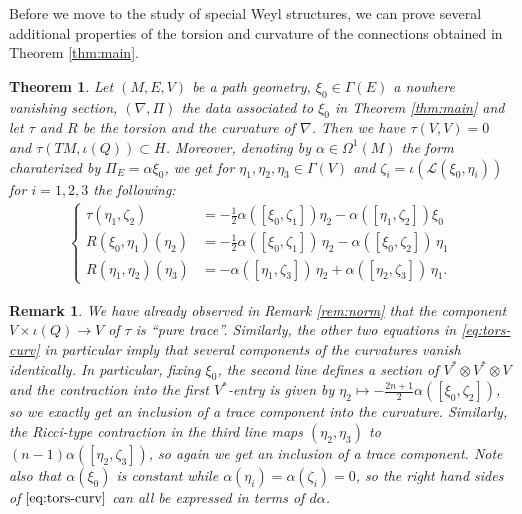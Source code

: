 \documentclass[11pt]{amsart}
\newtheorem{theorem}[proposition]{Theorem}
\newtheorem{remark}[proposition]{Remark}
\numberwithin{proposition}{section}
\numberwithin{equation}{section}
\begin{document}
Before we move to the study of special Weyl structures, we can prove several additional properties of the torsion and curvature of the connections obtained in Theorem \ref{thm:main}. 
\begin{theorem}\label{tors-curv}
  Let $(M,E,V)$ be a path geometry, $\xi_0\in\Gamma(E)$ a nowhere vanishing section, $(\nabla,\Pi)$ the data associated to $\xi_0$ in Theorem \ref{thm:main} and let $\tau$ and $R$ be the torsion and the curvature of $\nabla$. Then we have $\tau(V,V)=0$ and $\tau(TM,\iota(Q))\subset H$. Moreover, denoting by $\alpha\in\Omega^1(M)$ the form charaterized by $\Pi_E=\alpha\xi_0$, we get for $\eta_1,\eta_2,\eta_3\in\Gamma(V)$ and $\zeta_i=\iota(\mathcal L(\xi_0,\eta_i))$ for $i=1,2,3$ the following:
\begin{equation}\label{eq:tors-curv}
\begin{aligned}
\begin{cases}
\tau(\eta_1,\zeta_2)&=-\tfrac12\alpha([\xi_0,\zeta_1])\eta_2-\alpha([\eta_1,\zeta_2])\xi_0\\ 
R(\xi_0,\eta_1)(\eta_2)&=-\tfrac12\alpha([\xi_0,\zeta_1])\,\eta_2-\alpha([\xi_0,\zeta_2])\,\eta_1\\
R(\eta_1,\eta_2)(\eta_3)&=-\alpha([\eta_1,\zeta_3])\,\eta_2+\alpha([\eta_2,\zeta_3])\,\eta_1.
\end{cases}
\end{aligned}
\end{equation}  
\end{theorem}
\begin{remark}\label{rem:curvature}
   We have already observed in Remark \ref{rem:norm} that the component $V\times\iota(Q)\to V$ of $\tau$ is ``pure trace''. Similarly, the other two equations in \eqref{eq:tors-curv} in particular imply that several components of the curvatures vanish identically. In particular, fixing $\xi_0$, the second line defines a section of $V^*\otimes V^*\otimes V$ and the contraction into the first $V^*$-entry is given by $\eta_2\mapsto -\frac{2n+1}{2}\alpha([\xi_0,\zeta_2])$, so we exactly get an inclusion of a trace component into the curvature. Similarly, the Ricci-type contraction in the third line maps $(\eta_2,\eta_3)$ to $(n-1)\alpha([\eta_2,\zeta_3])$, so again we get an inclusion of a trace component. Note also that $\alpha(\xi_0)$ is constant while $\alpha(\eta_i)=\alpha(\zeta_i)=0$, so the right hand sides of $\eqref{eq:tors-curv}$ can all be expressed in terms of $d\alpha$. 
\end{remark}
\end{document}
